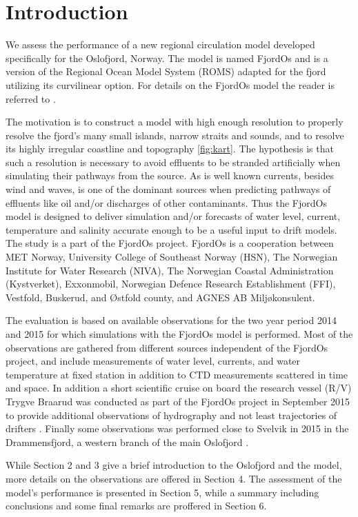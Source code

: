 
\section{Introduction}

We assess the performance of a new regional circulation model developed specifically for the Oslofjord, Norway. The model is named FjordOs and is a version of the Regional Ocean Model System (ROMS) adapted for the fjord utilizing its curvilinear option. For details on the FjordOs model the reader is referred to \cite{roed:etal:2016}. 

The motivation is to construct a model with high enough resolution to properly resolve the fjord's many small islands, narrow straits and sounds, and to resolve its highly irregular coastline and topography \ref{fig:kart}. The hypothesis is that such a resolution is necessary to avoid effluents to be stranded artificially when simulating their pathways from the source. As is well known currents, besides wind and waves, is one of the dominant sources when predicting pathways of effluents like oil and/or discharges of other contaminants. Thus the FjordOs model is designed to deliver simulation and/or forecasts of water level, current, temperature and salinity accurate enough to be a useful input to drift models.
The study is a part of the FjordOs project. FjordOs is a cooperation between MET Norway, University College of Southeast Norway (HSN), The Norwegian Institute for Water Research (NIVA), The Norwegian Coastal Administration (Kystverket), Exxonmobil, Norwegian Defence Research Establishment (FFI), Vestfold, Buskerud, and {\O}stfold county, and AGNES AB Milj{\o}konsulent.

The evaluation is based on available observations for the two year period 2014 and 2015 for which simulations with the FjordOs model is performed. Most of the observations are gathered from different sources independent of the FjordOs project, and include measurements of water level, currents, and water temperature at fixed station in addition to CTD measurements scattered in time and space. In addition a short scientific cruise on board the research vessel (R/V) Trygve Braarud was conducted as part of the FjordOs project in September 2015 to provide additional observations of hydrography and not least trajectories of drifters \citep{hjelm:etal:2016}. Finally some observations was performed close to Svelvik in 2015 in the Drammensfjord, a western branch of the main Oslofjord \citep{staalstrom:2017}.

While Section 2 and 3 give a brief introduction to the Oslofjord and the model, more details on the observations are offered in Section 4. The assessment of the model's performance is presented in Section 5, while a summary including conclusions and some final remarks are proffered in Section 6. 



